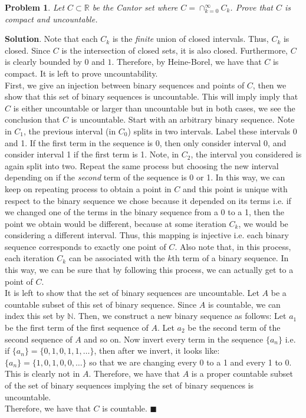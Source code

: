 \documentclass[12pt]{article}
\renewcommand{\=}[1]{\stackrel{#1}{=}} %
\newtheorem{p}{Problem}[section]
\theoremstyle{definition}
\newenvironment{s}{%
        \begin{trivlist} \item \textbf{Solution}. }{%
            \hspace*{\fill} $\blacksquare$\end{trivlist}}%
\begin{document}
\begin{p}
    Let $C\subset \mathbb{R}$ be the Cantor set where $C = \cap_{k=0}^{\infty} C_k$. Prove that $C$ is compact and uncountable.
\end{p}

\begin{s}
    Note that each $C_k$ is the \textit{finite} union of closed intervals. Thus, $C_k$ is closed. Since $C$ is the intersection
    of closed sets, it is also closed. Furthermore, $C$ is clearly bounded by $0$ and $1$. Therefore, by Heine-Borel, we have that
    $C$ is compact. It is left to prove uncountability.\\

    First, we give an injection between binary sequences and points of $C$, then we show that this set of binary sequences
    is uncountable. This will imply imply that $C$ is either uncountable or larger than uncountable but in both cases, we see
    the conclusion that $C$ is uncountable. Start with an arbitrary
    binary sequence. Note in $C_1$, the previous interval (in $C_0$) splits in two intervals. Label these intervals 0 and 1. If
    the first term in the sequence is 0, then only consider interval 0, and consider interval 1 if the first term is 1. Note,
    in $C_2$, the interval you considered is again split into two. Repeat the same process but choosing the new interval depending
    on if the \textit{second} term of the sequence is 0 or 1. In this way, we can keep on repeating process to obtain a point
    in $C$ and this point is unique with respect to the binary sequence we chose because it depended on its terms i.e. if we changed
    one of the terms in the binary sequence from a 0 to a 1, then the point we obtain would be different, because at some iteration
    $C_k$, we would be considering a different interval. Thus, this mapping is injective i.e. each binary sequence corresponds
    to exactly one point of $C$. Also note that, in this process, each iteration $C_k$ can be associated with the $k$th term of
    a binary sequence. In this way, we can be sure that by following this process, we can actually get to a point of $C$.\\

    It is left to show that the set of binary sequences are uncountable. Let $A$ be a countable subset of this set of binary sequence.
    Since $A$ is countable, we can index this set by $\mathbb{N}$. Then, we construct a new binary sequence as follows:
    Let $a_1$ be the first term of the first sequence of $A$. Let $a_2$ be the second term of the second sequence of $A$ and so on.
    Now invert every term in the sequence $\{a_n\}$ i.e. if $\{a_n\} = \{0,1,0,1,1,\hdots\}$, then after we invert, it looks like:
    $\{a_n\} = \{1,0,1,0,0,\hdots\}$ so that we are changing every 0 to a 1 and every 1 to 0. This is clearly not in $A$. Therefore,
    we have that $A$ is a proper countable subset of the set of binary sequences implying the set of binary sequences is uncountable.\\

    Therefore, we have that $C$ is countable.
\end{s}
\end{document}
